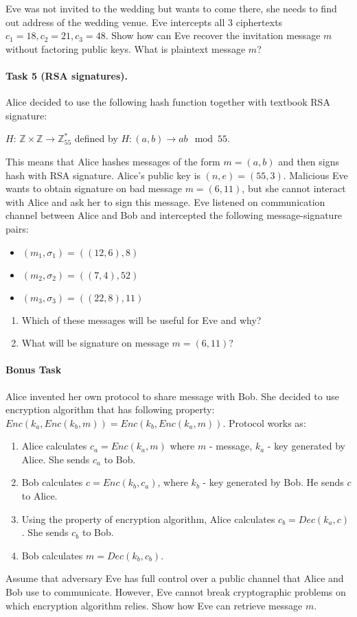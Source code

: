 \documentclass{article}
\begin{document}
Eve was not invited to the wedding but wants to come there, she needs to find out address of the wedding venue. Eve intercepts all $3$ ciphertexts $c_1= 18,c_2= 21,c_3= 48$. Show how can Eve recover the invitation message $m$ without factoring public keys. What is plaintext message $m$?


\paragraph{Task 5 (RSA signatures).} Alice decided to use the following hash function together with textbook RSA signature:
\begin{center}
    $H$: $\mathbb{Z} \times \mathbb{Z} \rightarrow \mathbb{Z}^*_{55}$ defined by $H: (a,b) \rightarrow ab \mod{55}$.
\end{center}
This means that Alice hashes messages of the form $m = (a,b)$ and then signs hash with RSA signature. Alice's public key is $(n,e) = (55,3)$. Malicious Eve wants to obtain signature on bad message $m = (6,11)$, but she cannot interact with Alice and ask her to sign this message. Eve listened on communication channel between Alice and Bob and intercepted the following message-signature pairs:
\begin{itemize}
    \item $(m_1, \sigma_1) = ((12,6), 8)$
    \item $(m_2, \sigma_2) = ((7,4), 52)$
    \item $(m_3, \sigma_3) = ((22,8), 11)$
\end{itemize}

\begin{enumerate}
    \item Which of these messages will be useful for Eve and why? 
    \item What will be signature on message $m = (6,11)$?
\end{enumerate}


\paragraph{Bonus Task} 
Alice invented her own protocol to share message with Bob. She decided to use encryption algorithm that has following property: $Enc(k_a, Enc(k_b, m)) = Enc(k_b, Enc(k_a, m))$. Protocol works as:
\begin{enumerate}
    \item Alice calculates $c_a = Enc(k_a, m)$ where $m$ - message, $k_a$ - key generated by Alice. She sends $c_a$ to Bob. 
    \item Bob calculates $c=Enc(k_b, c_a)$, where $k_b$ - key generated by Bob. He sends $c$ to Alice.
    \item Using the property of encryption algorithm, Alice calculates $c_b=Dec(k_a, c)$. She sends $c_b$ to Bob.
    \item Bob calculates $m=Dec(k_b, c_b)$.
\end{enumerate}

Assume that adversary Eve has full control over a public channel that Alice and Bob use to communicate. However, Eve cannot break cryptographic problems on which encryption algorithm relies. Show how Eve can retrieve message $m$. 
\end{document}
